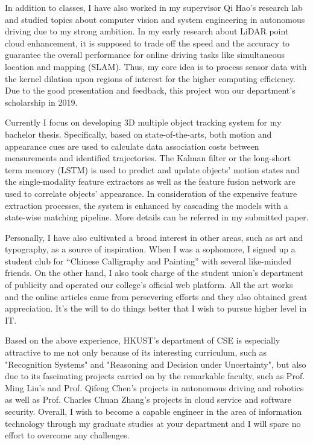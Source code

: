 \documentclass{article}
\begin{document}
In addition to classes, I have also worked in my supervisor Qi Hao's research lab and studied topics about computer vision and system engineering in autonomous driving due to my strong ambition. In my early research about LiDAR point cloud enhancement, it is supposed to trade off the speed and the accuracy to guarantee the overall performance for online driving tasks like simultaneous location and mapping (SLAM). Thus, my core idea is to process sensor data with the kernel dilation upon regions of interest for the higher computing efficiency. Due to the good presentation and feedback, this project won our department's scholarship in 2019. 

Currently I focus on developing 3D multiple object tracking system for my bachelor thesis. Specifically, based on state-of-the-arts, both motion and appearance cues are used to calculate data association costs between measurements and identified trajectories. The Kalman filter or the long-short term memory (LSTM) is used to predict and update objects' motion states and the single-modality feature extractors as well as the feature fusion network are used to correlate objects' appearance. In consideration of the expensive feature extraction processes, the system is enhanced by cascading the models with a state-wise matching pipeline. More details can be referred in my submitted paper. 

Personally, I have also cultivated a broad interest in other areas, such as art and typography, as a source of inspiration. When I was a sophomore, I signed up a student club for ``Chinese Calligraphy and Painting'' with several like-minded friends. On the other hand, I also took charge of the student union's department of publicity and operated our college's official web platform. All the art works and the online articles came from persevering efforts and they also obtained great appreciation. It's the will to do things better that I wish to pursue higher level in IT.

Based on the above experience, HKUST's department of CSE is especially attractive to me not only because of its interesting curriculum, such as "Recognition Systems" and "Reasoning and Decision under Uncertainty", but also due to its fascinating projects carried on by the remarkable faculty, such as Prof. Ming Liu's and Prof. Qifeng Chen's projects in autonomous driving and robotics as well as Prof. Charles Chuan Zhang's projects in cloud service and software security. Overall, I wish to become a capable engineer in the area of information technology through my graduate studies at your department and I will spare no effort to overcome any challenges. 
\end{document}
